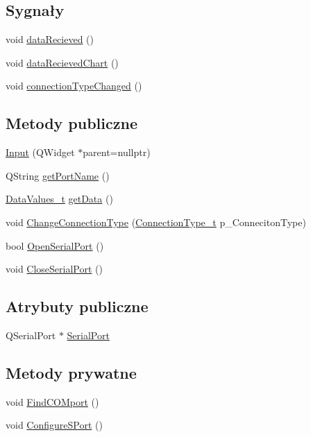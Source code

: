 \subsection*{Sygnały}
\begin{DoxyCompactItemize}
\item 
void \hyperlink{class_input_af152badf99b8ffc0f9f9b0718f334d79}{data\+Recieved} ()
\item 
void \hyperlink{class_input_a1cd92c513cfe42bd68e871bcf475e910}{data\+Recieved\+Chart} ()
\item 
void \hyperlink{class_input_ab5ff0e97818e34f8ab33f00ebd953720}{connection\+Type\+Changed} ()
\end{DoxyCompactItemize}
\subsection*{Metody publiczne}
\begin{DoxyCompactItemize}
\item 
\hyperlink{class_input_a167cd1dea1af062f99897a20c597aed8}{Input} (Q\+Widget $\ast$parent=nullptr)
\item 
Q\+String \hyperlink{class_input_ae7ea13b2215e1ab16b7d7312d7060eca}{get\+Port\+Name} ()
\item 
\hyperlink{struct_input_1_1_data_values__t}{Data\+Values\+\_\+t} \hyperlink{class_input_a3e7e79c0b9fc11cf350044031dbd92c9}{get\+Data} ()
\item 
void \hyperlink{class_input_a76cacaeadb1ceed7f3f9585220e906c8}{Change\+Connection\+Type} (\hyperlink{class_input_a3be20be9b454515798ecd3370f4e36fd}{Connection\+Type\+\_\+t} p\+\_\+\+Conneciton\+Type)
\item 
bool \hyperlink{class_input_a94465b0d69352fd533585256ff0bfea1}{Open\+Serial\+Port} ()
\item 
void \hyperlink{class_input_af60c2b300eadd2a25f47bb0c38c8bb2e}{Close\+Serial\+Port} ()
\end{DoxyCompactItemize}
\subsection*{Atrybuty publiczne}
\begin{DoxyCompactItemize}
\item 
Q\+Serial\+Port $\ast$ \hyperlink{class_input_af21e5ac2542fa5ef2b9b9c8be740901d}{Serial\+Port}
\end{DoxyCompactItemize}
\subsection*{Metody prywatne}
\begin{DoxyCompactItemize}
\item 
void \hyperlink{class_input_a2ae2fdceec929c159c5ee055b331714c}{Find\+C\+O\+Mport} ()
\item 
void \hyperlink{class_input_a1910fc2fed3b2f7055fa17f85529cce7}{Configure\+S\+Port} ()
\end{DoxyCompactItemize}

